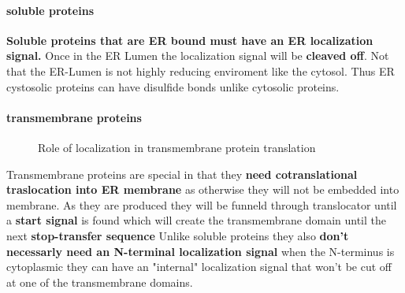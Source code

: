 \documentclass[../main.tex]{subfiles}
\begin{document}
\paragraph{soluble proteins}

\textbf{Soluble proteins that are ER bound must have an ER localization signal.} Once in the ER Lumen the localization signal will be \textbf{cleaved off}. Not that the ER-Lumen is not highly reducing enviroment like the cytosol. Thus ER cystosolic proteins can have disulfide bonds unlike cytosolic proteins.

\paragraph{transmembrane proteins}
\begin{figure}[H]
    \centering
    \hspace{0.05\textwidth} %
    \caption{Role of localization in transmembrane protein translation}
    \label{fig:ITC_all}
\end{figure}
Transmembrane proteins are special in that they \textbf{need cotranslational traslocation into ER membrane} as otherwise they will not be embedded into membrane. As they are produced they will be funneld through translocator until a \textbf{start signal }is found which will create the transmembrane domain until the next \textbf{stop-transfer sequence } Unlike soluble proteins they also \textbf{don't necessarly need an N-terminal localization signal} when the N-terminus is cytoplasmic they can have an "internal" localization signal that won't be cut off at one of the transmembrane domains.
\end{document}
